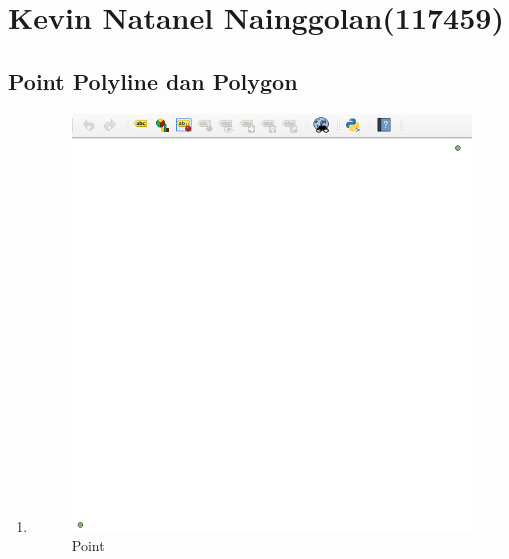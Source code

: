 \section{Kevin Natanel Nainggolan(117459)}
\subsection{Point Polyline dan Polygon}
\begin{enumerate}
	\item
	
	\begin{figure}[H]
		\includegraphics[width=12cm]{figures/1174059/Python1/soal1.PNG}
		\centering
		\caption{Point}
	\end{figure}
	

\end{enumerate}
